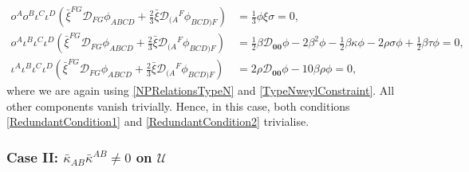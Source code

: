 \documentclass[10pt,a4paper]{article}
\newcommand\omicron{o}
\theoremstyle{plain}
\begin{document}
\begin{align*}
\omicron^A\omicron^B\iota^C\iota^D\left(\bar{\xi}^{FG}\mathcal{D}_{FG}\phi_{ABCD} + \tfrac{2}{3}\bar{\xi}\mathcal{D}_{(A}{}^F\phi_{BCD)F}\right)&=\tfrac{1}{3}\phi \xi \sigma=0,\\
\omicron^A\iota^B\iota^C\iota^D\left(\bar{\xi}^{FG}\mathcal{D}_{FG}\phi_{ABCD} + \tfrac{2}{3}\bar{\xi}\mathcal{D}_{(A}{}^F\phi_{BCD)F}\right)&= \tfrac{1}{2} \beta \mathcal{D}_{\bm0\bm0}\phi-2 \beta^2 \phi -  \tfrac{1}{2} \beta \kappa \phi - 2 \rho \sigma \phi + \tfrac{1}{2} \beta \tau \phi =0,\\
\iota^A\iota^B\iota^C\iota^D\left(\bar{\xi}^{FG}\mathcal{D}_{FG}\phi_{ABCD} + \tfrac{2}{3}\bar{\xi}\mathcal{D}_{(A}{}^F\phi_{BCD)F}\right) &= 2 \rho \mathcal{D}_{\bm0\bm0}\phi-10 \beta \rho \phi =0,
\end{align*}
where we are again using \eqref{NPRelationsTypeN} and \eqref{TypeNweylConstraint}. All other components vanish trivially. Hence, in this case, both conditions \eqref{RedundantCondition1} and \eqref{RedundantCondition2} trivialise. 


\subsubsection{Case II: $\bar{\kappa}_{AB}\bar{\kappa}^{AB}\neq 0$ on $\mathcal{U}$}\label{TypeDCase}
\end{document}
